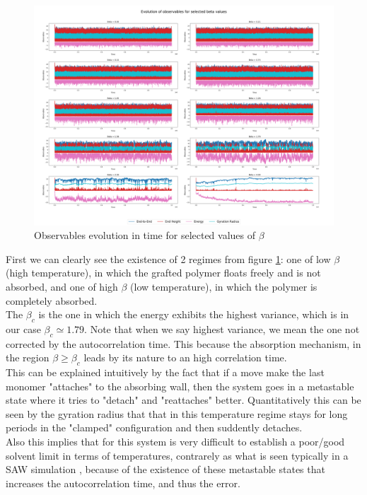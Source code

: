 \begin{figure}[H]
    \centering
    \includegraphics[width=\textwidth]{FIG/exercise_6_images/observables_polymer_summary.png}
    \caption{Observables evolution in time for selected values of $\beta$}
    \label{lec6:polymer_evolution_pre_mmc}
\end{figure}

First we can clearly see the existence of 2 regimes from figure \ref{lec6:polymer_evolution_pre_mmc}: one of low $\beta$ (high temperature), in which
the grafted polymer floats freely and is not absorbed, and one of high $\beta$ (low temperature), in which the polymer is completely absorbed. \\
The $\beta_c$ is the one in which the energy exhibits the highest variance, which is in our case $\beta_c \simeq 1.79$. Note that when we say highest variance, we mean the 
one not corrected by the autocorrelation time. This because the absorption mechanism, in the region $\beta \geq \beta_c$ leads by its nature to an high correlation time. \\
This can be explained intuitively by the fact that if a move make the last monomer "attaches" to the absorbing wall, then the system goes in a metastable state where it tries to 
"detach" and "reattaches" better. Quantitatively this can be seen by the gyration radius that that in this temperature regime stays for long periods in the "clamped" configuration
and then suddently detaches. \\
Also this implies that for this system is very difficult to establish a poor/good solvent limit in terms of temperatures, contrarely as what is seen typically in a SAW simulation \cite{OrlandoBrando}, because of the existence 
of these metastable states that increases the autocorrelation time, and thus the error.

